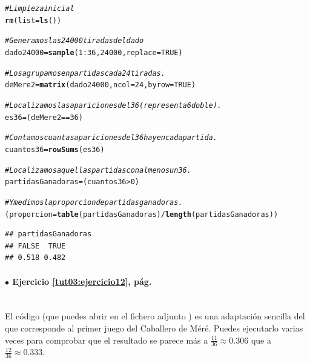 \documentclass[10pt,a4paper]{article}\usepackage[]{graphicx}\usepackage[]{color}
\makeatletter
\newcommand{\hlnum}[1]{\textcolor[rgb]{0.686,0.059,0.569}{#1}}%
\newcommand{\hlcom}[1]{\textcolor[rgb]{0.678,0.584,0.686}{\textit{#1}}}%
\newcommand{\hlopt}[1]{\textcolor[rgb]{0,0,0}{#1}}%
\newcommand{\hlstd}[1]{\textcolor[rgb]{0.345,0.345,0.345}{#1}}%
\newcommand{\hlkwb}[1]{\textcolor[rgb]{0.69,0.353,0.396}{#1}}%
\newcommand{\hlkwc}[1]{\textcolor[rgb]{0.333,0.667,0.333}{#1}}%
\newcommand{\hlkwd}[1]{\textcolor[rgb]{0.737,0.353,0.396}{\textbf{#1}}}%
\newenvironment{kframe}{%
 \def\at@end@of@kframe{}%
 \ifinner\ifhmode%
  \def\at@end@of@kframe{\end{minipage}}%
  \begin{minipage}{\columnwidth}%
 \fi\fi%
 \def\FrameCommand##1{\hskip\@totalleftmargin \hskip-\fboxsep
 \colorbox{shadecolor}{##1}\hskip-\fboxsep
     \hskip-\linewidth \hskip-\@totalleftmargin \hskip\columnwidth}%
 \MakeFramed {\advance\hsize-\width
   \@totalleftmargin\z@ \linewidth\hsize
   \@setminipage}}%
 {\par\unskip\endMakeFramed%
 \at@end@of@kframe}
\newenvironment{knitrout}{}{} %
\makeatother
\begin{document}
\begin{knitrout}
\color{fgcolor}\begin{kframe}
\begin{alltt}
\hlcom{# Limpieza inicial}
\hlkwd{rm}\hlstd{(}\hlkwc{list}\hlstd{=}\hlkwd{ls}\hlstd{())}

\hlcom{# Generamos las 24000 tiradas del dado}
\hlstd{dado24000} \hlkwb{=} \hlkwd{sample}\hlstd{(}\hlnum{1}\hlopt{:}\hlnum{36}\hlstd{,} \hlnum{24000}\hlstd{,} \hlkwc{replace} \hlstd{=} \hlnum{TRUE}\hlstd{)}

\hlcom{# Los agrupamos en partidas cada 24 tiradas.}
\hlstd{deMere2} \hlkwb{=} \hlkwd{matrix}\hlstd{(dado24000,} \hlkwc{ncol} \hlstd{=} \hlnum{24}\hlstd{,} \hlkwc{byrow} \hlstd{=} \hlnum{TRUE}\hlstd{)}

\hlcom{# Localizamos las apariciones del 36 (representa 6 doble).}
\hlstd{es36} \hlkwb{=} \hlstd{(deMere2} \hlopt{==} \hlnum{36}\hlstd{)}

\hlcom{# Contamos cuantas apariciones del 36 hay en cada partida.}
\hlstd{cuantos36} \hlkwb{=} \hlkwd{rowSums}\hlstd{(es36)}

\hlcom{# Localizamos aquellas partidas con al menos un 36.}
\hlstd{partidasGanadoras} \hlkwb{=} \hlstd{(cuantos36} \hlopt{>} \hlnum{0}\hlstd{)}

\hlcom{# Y medimos la proporcion de partidas ganadoras.}
\hlstd{(proporcion} \hlkwb{=} \hlkwd{table}\hlstd{(partidasGanadoras)}\hlopt{/}\hlkwd{length}\hlstd{(partidasGanadoras))}
\end{alltt}
\begin{verbatim}
## partidasGanadoras
## FALSE  TRUE 
## 0.518 0.482
\end{verbatim}
\end{kframe}
\end{knitrout}

\paragraph{\bf $\bullet$ Ejercicio \ref{tut03:ejercicio12}, pág. \pageref{tut03:ejercicio12}}
\label{tut03:ejercicio12:sol}\quad\\

El código (que puedes abrir en el fichero adjunto ) es una adaptación sencilla del que corresponde al primer juego del Caballero de Méré. Puedes ejecutarlo varias veces para comprobar que el resultado se parece más a $\frac{11}{36}\approx0.306$ que a $\frac{12}{36}\approx0.333$.
\end{document}

